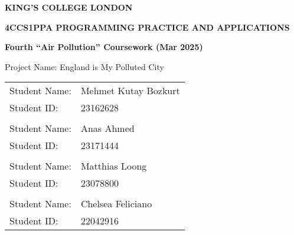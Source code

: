 \documentclass[10pt, a4paper]{scrartcl}
\begin{document}
    

\begin{titlepage}
    \begin{center}
        \Huge
        \textbf{KING'S COLLEGE LONDON}

        \vspace{2cm}

        \LARGE
        \textbf{4CCS1PPA PROGRAMMING PRACTICE AND APPLICATIONS}

        \vspace{1cm}

        \Large
        \textbf{Fourth “Air Pollution” Coursework (Mar 2025)}

        \vspace{1cm}

        \Large
        Project Name: England is My Polluted City

        \vspace{1cm}

        \Large
        \begin{tabular}{l l}
            Student Name: & Mehmet Kutay Bozkurt \\
            Student ID: & 23162628 \\
            \vspace{0.5cm} & \\
            Student Name: & Anas Ahmed \\
            Student ID: & 23171444 \\
            \vspace{0.5cm} & \\
            Student Name: & Matthias Loong \\
            Student ID: & 23078800 \\
            \vspace{0.5cm} & \\
            Student Name: & Chelsea Feliciano \\
            Student ID: & 22042916
        \end{tabular}
    \end{center}
\end{titlepage}
\end{document}

